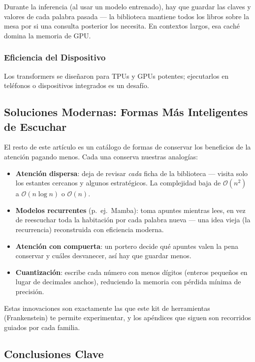Durante la inferencia (al usar un modelo entrenado), hay que guardar las claves y valores de cada palabra pasada --- la biblioteca mantiene todos los libros sobre la mesa por si una consulta posterior los necesita. En contextos largos, esa caché domina la memoria de GPU.

\subsubsection{Eficiencia del Dispositivo}

Los transformers se diseñaron para TPUs y GPUs potentes; ejecutarlos en teléfonos o dispositivos integrados es un desafío.

\subsection{Soluciones Modernas: Formas Más Inteligentes de Escuchar}
\label{subsec:tut-solutions}

El resto de este artículo es un catálogo de formas de conservar los beneficios de la atención pagando menos. Cada una conserva nuestras analogías:

\begin{itemize}[leftmargin=*]
    \item \textbf{Atención dispersa}: deja de revisar \emph{cada} ficha de la biblioteca --- visita solo los estantes cercanos y algunos estratégicos. La complejidad baja de $\mathcal{O}(n^2)$ a $\mathcal{O}(n \log n)$ o $\mathcal{O}(n)$.
    \item \textbf{Modelos recurrentes} (p.\ ej.\ Mamba): toma apuntes mientras lees, en vez de reescuchar toda la habitación por cada palabra nueva --- una idea vieja (la recurrencia) reconstruida con eficiencia moderna.
    \item \textbf{Atención con compuerta}: un portero decide qué apuntes valen la pena conservar y cuáles desvanecer, así hay que guardar menos.
    \item \textbf{Cuantización}: escribe cada número con menos dígitos (enteros pequeños en lugar de decimales anchos), reduciendo la memoria con pérdida mínima de precisión.
\end{itemize}

Estas innovaciones son exactamente las que este kit de herramientas (Frankenstein) te permite experimentar, y los apéndices que siguen son recorridos guiados por cada familia.

\subsection{Conclusiones Clave}

